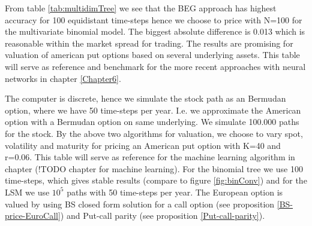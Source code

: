 From table \ref{tab:multidimTree} we see that the BEG approach has highest accuracy for 100 equidistant time-steps hence we choose to price with N=100 for the multivariate binomial model. The biggest absolute difference is 0.013 which is reasonable within the market spread for trading. The results are promising for valuation of american put options based on several underlying assets. This table will serve as reference and benchmark for the more recent approaches with neural networks in chapter \ref{Chapter6}.

The computer is discrete, hence we simulate the stock path as an Bermudan option, where we have 50 time-steps per year. I.e. we approximate the American option with a Bermudan option on same underlying. 
 We simulate 100.000 paths for the stock.
By the above two algorithms for valuation, we choose to vary spot, volatility and maturity for pricing an American put option with K=40 and r=0.06. This table will serve as reference for the machine learning algorithm in chapter (!TODO chapter for machine learning). For the binomial tree we use 100 time-steps, which gives stable results (compare to figure \ref{fig:binConv}) and for the LSM we use $10^5$ paths with 50 time-steps per year. The European option is valued by using BS closed form solution for a call option (see proposition \ref{BS-price-EuroCall}) and Put-call parity (see proposition \ref{Put-call-parity}).
